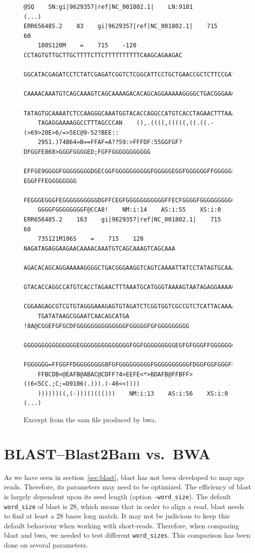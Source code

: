 \begin{figure}[H]
\begin{lstlisting}[basicstyle=\ttfamily\footnotesize,frameround=ftft,frame=trBL]
@SQ    SN:gi|9629357|ref|NC_001802.1|    LN:9181
(...)
ERR656485.2    83    gi|9629357|ref|NC_001802.1|    715    60
    180S120M    =    715    -120    CCTAGTGTTGCTTGCTTTTCTTCTTTTTTTTTTCAAGCAGAAGAC
    GGCATACGAGATCCTCTATCGAGATCGGTCTCGGCATTCCTGCTGAACCGCTCTTCCGATCTAAGATAGAGGAAGAA
    CAAAACAAATGTCAGCAAAGTCAGCAAAAGACACAGCAGGAAAAAGGGGCTGACGGGAAGGTCAGTCAAAATTATCC
    TATAGTGCAAAATCTCCAAGGGCAAATGGTACACCAGGCCATGTCACCTAGAACTTTAAATGCATGGGTAAAAGTAA
    TAGAGGAAAAGGCCTTTAGCCCAN    (),.((((,(((((,((.((.-(>69>20E>6/=>5EC@9-52?BEE::
    2951.)74B64=B==FFAF=A??59:>FFFDF:55GGFGF?DFGGFE868>GGGFGGGGED;FGFFGGGGGGGGGGG
    EFFGE9GGGGFGGGGGGGGDGECGGFGGGGGGGGGGFGGGGGEGGFGGGGGGFFGGGGGFF?EGGFFFEGGGGGGGG
    FEGGGEGGGFEGGGGGGGGGGDGFFCEGFGGGGGGGGGGGFFECFGGGGFGGGGGGGGGGGFCGGGGGGGGGGGGGG
    GGGGFGGGGGGGGF@CCA8!    NM:i:14    AS:i:55    XS:i:0
ERR656485.2    163    gi|9629357|ref|NC_001802.1|    715    60
    73S121M106S    =    715    120    NAGATAGAGGAAGAACAAAACAAATGTCAGCAAAGTCAGCAAA
    AGACACAGCAGGAAAAAGGGGCTGACGGGAAGGTCAGTCAAAATTATCCTATAGTGCAAAATCTCCAAGGGCAAATG
    GTACACCAGGCCATGTCACCTAGAACTTTAAATGCATGGGTAAAAGTAATAGAGGAAAAGGCCTTTAGCCCAGAGAT
    CGGAAGAGCGTCGTGTAGGGAAAGAGTGTAGATCTCGGTGGTCGCCGTCTCATTACAAAAAAAACATACACAATAAA
    TGATATAAGCGGAATCAACAGCATGA    !8A@CGGEFGFGCDFGGGGGGGGGGGGGGFGGGGGFGFGGGGGGGGG
    GGGGGGGGGGGGGGGEGGGGGGGGGGGGGGFGGFGGGGGGGGGEGFGFGGGFFGGGGGGGGFGGGGGGGGGGGGFFF
    FGGGGGG=FFGGFFDGGGGGGGG8FGFGGGGGGGGGFGGGGGGGGGGFDGGFGGFGGGFFFGFF8DFDFDFFFFFFF
    FFBCDB<@EAFB@ABAC@CDFF?4>EEFE<*>BDAFB@FFBFF>((6<5CC.;C;=D9106(.))).)-46<<))))
    ))))))((,(-)))()((()))    NM:i:13    AS:i:56    XS:i:0
(...)
\end{lstlisting}
\caption{Excerpt from the \acrshort{sam} file produced by \acrshort{bwa}.}
\label{fig:samBWA}
\end{figure}


\section{BLAST--Blast2Bam vs.~BWA}
As we have seen in section~\ref{sec:blast}, \gls{blast} has not been developed to map \gls{ngs} reads.
Therefore, its parameters may need to be optimized.
The efficiency of \gls{blast} is largely dependent upon its seed length (option \texttt{-word\_size}).
The default \texttt{word\_size} of \gls{blast} is 28, which means that in order to align a read, \gls{blast} needs to find at least a 28 bases long match.
It may not be judicious to keep this default behaviour when working with short-reads.
Therefore, when comparing \gls{blast} and \gls{bwa}, we needed to test different \texttt{word\_sizes}.
This comparison has been done on several parameters.


